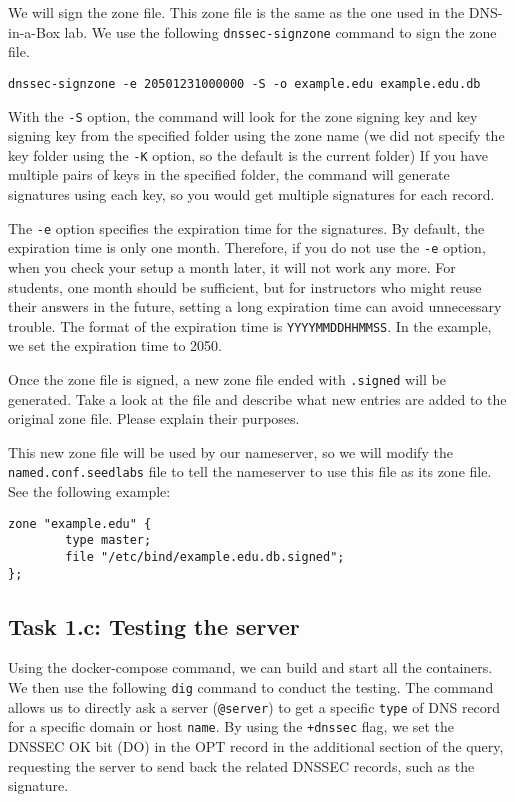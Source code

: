 We will sign the zone file. This zone file 
is the same as the one used in the DNS-in-a-Box lab. We use the 
following \texttt{dnssec-signzone} command to sign the zone file.  


\begin{lstlisting}
dnssec-signzone -e 20501231000000 -S -o example.edu example.edu.db
\end{lstlisting}
 
With the \texttt{-S} option, the command will look
for the zone signing key and key signing key 
from the specified folder using the zone name (we did not specify the key folder 
using the \texttt{-K} option, so the default is the current folder)
If you have multiple pairs of keys in the specified folder,
the command will generate signatures using each key, so you would get 
multiple signatures for each record. 

The \texttt{-e} option specifies the expiration time for the 
signatures. By default, the expiration time is only one month. Therefore,
if you do not use the \texttt{-e} option, when you check your setup
a month later, it will not work any more. For students, one month 
should be sufficient, but for instructors who might reuse their answers in
the future, setting a long expiration time can avoid unnecessary trouble. 
The format of the expiration time is \texttt{YYYYMMDDHHMMSS}. In the example, we 
set the expiration time to 2050. 


Once the zone file is signed, a new zone file ended with
\texttt{.signed} will be generated. Take a look at the file and describe 
what new entries are added to the original zone file. Please explain
their purposes. 


This new zone file will be used by our nameserver, so 
we will modify the \texttt{named.conf.seedlabs} file to tell the 
nameserver to use this file as its zone file. See the following 
example: 

\begin{lstlisting}
zone "example.edu" {
        type master;
        file "/etc/bind/example.edu.db.signed";
};
\end{lstlisting}


\subsection{Task 1.c: Testing the server}

Using the docker-compose command, we can build and start all the 
containers. We then use the following \texttt{dig} command to conduct the testing. 
The command allows us to directly ask 
a server (\texttt{@server}) to get a specific \texttt{type}
of DNS record for a specific domain or host \texttt{name}.
By using the \texttt{+dnssec} flag, we set the DNSSEC OK bit (DO) in the OPT record 
in the additional section of the query, requesting the server to
send back the related DNSSEC records, such as the signature. 

